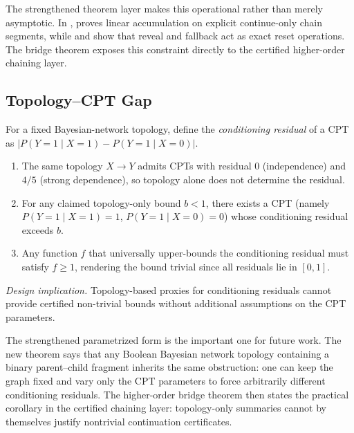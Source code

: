\documentclass[11pt,openany]{report}
\begin{document}
The strengthened theorem layer makes this operational rather than merely
asymptotic.  In
,
 proves linear
accumulation on explicit continue-only chain segments, while
 and
 show that reveal and fallback
act as exact reset operations.  The bridge theorem
 exposes this
constraint directly to the certified higher-order chaining layer.

\subsection*{Topology--CPT Gap}

\begin{theorem}
\label{thm:topology-cpt-gap}
For a fixed Bayesian-network topology, define the \emph{conditioning
residual} of a CPT as $|P(Y{=}1 \mid X{=}1) - P(Y{=}1 \mid X{=}0)|$.
\begin{enumerate}
  \item The same topology $X \to Y$ admits CPTs with residual $0$ (independence)
  and $4/5$ (strong dependence), so topology alone does not determine the
  residual.
  \item For any claimed topology-only bound $b < 1$, there exists a CPT
  (namely $P(Y{=}1 \mid X{=}1) = 1$, $P(Y{=}1 \mid X{=}0) = 0$) whose
  conditioning residual exceeds $b$.
  \item Any function $f$ that universally upper-bounds the conditioning
  residual must satisfy $f \ge 1$, rendering the bound trivial since all
  residuals lie in $[0,1]$.
\end{enumerate}
\end{theorem}

\textit{Design implication.}  Topology-based proxies for conditioning
residuals cannot provide certified non-trivial bounds without additional
assumptions on the CPT parameters.

The strengthened parametrized form is the important one for future work.  The
new theorem
 says that any
Boolean Bayesian network topology containing a binary parent--child fragment
inherits the same obstruction: one can keep the graph fixed and vary only the
CPT parameters to force arbitrarily different conditioning residuals.  The
higher-order bridge theorem  then
states the practical corollary in the certified chaining layer: topology-only
summaries cannot by themselves justify nontrivial continuation certificates.
\end{document}
